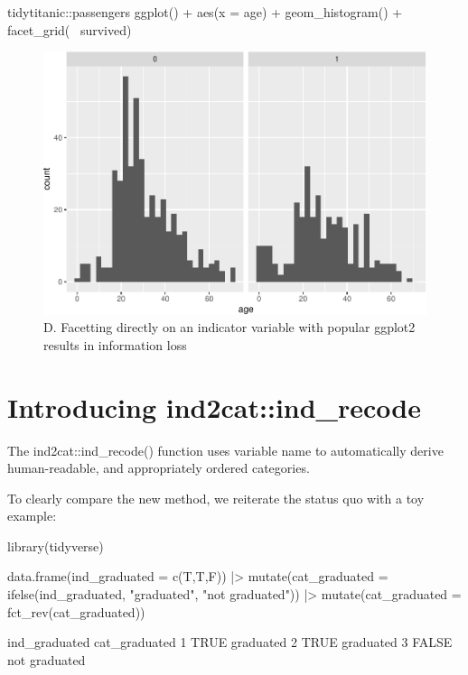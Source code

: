 \begin{Schunk}
\begin{Sinput}
tidytitanic::passengers %
ggplot() + 
  aes(x = age) + 
  geom_histogram() + 
  facet_grid(~ survived)
\end{Sinput}
\begin{figure}
\includegraphics[width=0.69\linewidth]{r_journal_files/figure-latex/unnamed-chunk-7-1} \caption[D]{D. Facetting directly on an indicator variable with popular ggplot2 results in information loss}\label{fig:unnamed-chunk-7}
\end{figure}
\end{Schunk}

\hypertarget{introducing-ind2catind_recode}{%
\section{Introducing
ind2cat::ind\_recode}\label{introducing-ind2catind_recode}}

The ind2cat::ind\_recode() function uses variable name to automatically
derive human-readable, and appropriately ordered categories.

To clearly compare the new method, we reiterate the status quo with a
toy example:

\begin{Schunk}
\begin{Sinput}
library(tidyverse)

data.frame(ind_graduated = c(T,T,F)) |>
  mutate(cat_graduated  = ifelse(ind_graduated, 
                                 "graduated", 
                                 "not graduated")) |>
  mutate(cat_graduated = fct_rev(cat_graduated))  
\end{Sinput}
\begin{Soutput}
       ind_graduated cat_graduated
     1          TRUE     graduated
     2          TRUE     graduated
     3         FALSE not graduated
\end{Soutput}
\end{Schunk}

